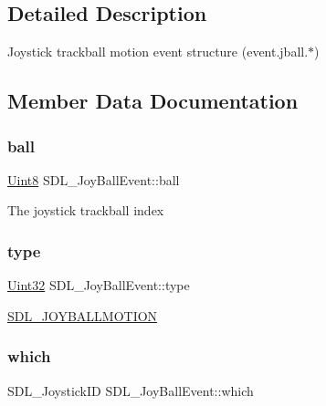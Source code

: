 \subsection{Detailed Description}
Joystick trackball motion event structure (event.\+jball.$\ast$) 

\subsection{Member Data Documentation}
\mbox{\label{struct_s_d_l___joy_ball_event_add4eb0daeaf95ae56e8c7cfcec560242}} 
\subsubsection{\texorpdfstring{ball}{ball}}
{\footnotesize\ttfamily \hyperlink{_s_d_l__stdinc_8h_a2944638813a090aa23e62f4da842c3e2}{Uint8} S\+D\+L\+\_\+\+Joy\+Ball\+Event\+::ball}

The joystick trackball index \mbox{\label{struct_s_d_l___joy_ball_event_a0b192b95a043cb494b27ed9b27e84db1}} 
\subsubsection{\texorpdfstring{type}{type}}
{\footnotesize\ttfamily \hyperlink{_s_d_l__stdinc_8h_add440eff171ea5f55cb00c4a9ab8672d}{Uint32} S\+D\+L\+\_\+\+Joy\+Ball\+Event\+::type}

\hyperlink{_s_d_l__events_8h_a3b589e89be6b35c02e0dd34a55f3fccaa78f859489cfd565c305c7f6f9d5b25c1}{S\+D\+L\+\_\+\+J\+O\+Y\+B\+A\+L\+L\+M\+O\+T\+I\+ON} \mbox{\label{struct_s_d_l___joy_ball_event_a4e2e185717d529167cd0bea21093c454}} 
\subsubsection{\texorpdfstring{which}{which}}
{\footnotesize\ttfamily S\+D\+L\+\_\+\+Joystick\+ID S\+D\+L\+\_\+\+Joy\+Ball\+Event\+::which}

